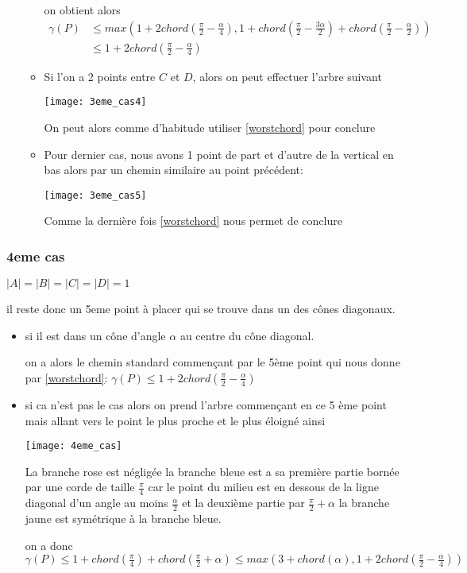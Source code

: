 \begin{itemize}
\begin{itemize}
on obtient alors
\begin{align*}
\gamma(P) &\leq max\left(1+2chord\left(\frac{\pi}{2} - \frac{\alpha}{4}\right), 1 + chord\left(\frac{\pi}{2} - \frac{3\alpha}{2}\right) + chord\left(\frac{\pi}{2} - \frac{\alpha}{2}\right)\right) \\
&\leq 1+2chord\left(\frac{\pi}{2} - \frac{\alpha}{4}\right)
\end{align*}

\item Si l'on a 2 points entre $C$ et $D$, alors on peut effectuer l'arbre suivant

\texttt{[image: 3eme\_cas4]}

On peut alors comme d'habitude utiliser \ref{worstchord} pour conclure

\item Pour dernier cas, nous avons 1 point de part et d'autre de la vertical en bas alors par un chemin similaire au point précédent:

\texttt{[image: 3eme\_cas5]}

Comme la dernière fois \ref{worstchord} nous permet de conclure

\end{itemize}
\end{itemize}

\subsubsection*{4eme cas} $|A| = |B| = |C| = |D| = 1$

il reste donc un 5eme point à placer qui se trouve dans un des cônes diagonaux.

\begin{itemize}

\item si il est dans un cône d'angle $\alpha$ au centre du cône diagonal.

on a alors le chemin standard commençant par le 5ème point qui nous donne par \ref{worstchord}: $\gamma(P) \leq 1 + 2chord(\frac{\pi}{2} - \frac{\alpha}{4})$

\item si ca n'est pas le cas alors on prend l'arbre commençant en ce 5 ème point mais allant vers le point le plus proche et le plus éloigné ainsi

\texttt{[image: 4eme\_cas]}

La branche rose est négligée
la branche bleue est a sa première partie bornée par une corde de taille $\frac{\pi}{4}$ car le point du milieu est en dessous de la ligne diagonal d'un angle au moins $\frac{\alpha}{2}$ et la deuxième partie par $\frac{\pi}{2} + \alpha$
la branche jaune est symétrique à la branche bleue.

on a donc $\gamma(P) \leq 1 + chord(\frac{\pi}{4}) + chord(\frac{\pi}{2} + \alpha) \leq max(3 + chord(\alpha), 1 + 2chord(\frac{\pi}{2} - \frac{\alpha}{4}))$

\end{itemize}

